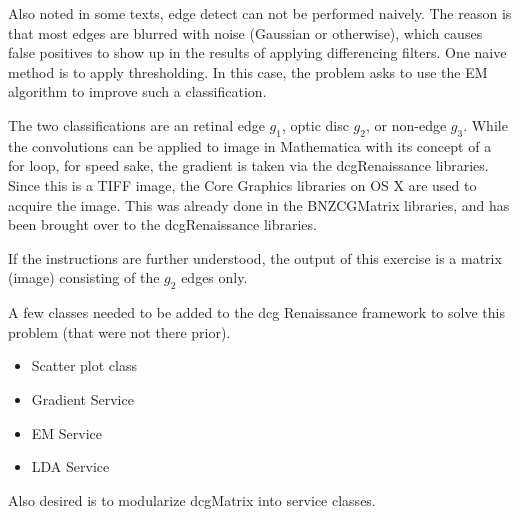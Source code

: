 \documentclass[11pt]{article}
\begin{document}
Also noted in some texts, edge detect can not be performed naively.  The reason is that most edges are blurred with noise (Gaussian or otherwise), which causes false positives to show up in the results of applying differencing filters.  One naive method is to apply thresholding.    In this case, the problem asks to use the EM algorithm to improve such a classification.   

The two classifications are an retinal edge $g_1$, optic disc $g_2$, or non-edge $g_3$.  While the convolutions can be applied to image in Mathematica with its concept of a for loop, for speed sake, the gradient is taken via the dcgRenaissance libraries.  Since this is a TIFF image, the Core Graphics libraries on OS X are used to acquire the image.  This was already done in the BNZCGMatrix libraries, and has been brought over to the dcgRenaissance libraries.  

If the instructions are further understood, the output of this exercise is a matrix (image) consisting of the $g_2$ edges only.  

A few classes needed to be added to the dcg Renaissance framework to solve this problem (that were not there prior).
\begin{itemize}
\item Scatter plot class
\item Gradient Service
\item EM Service
\item LDA Service
\end{itemize}
Also desired is to modularize dcgMatrix into service classes.  
\end{document}

